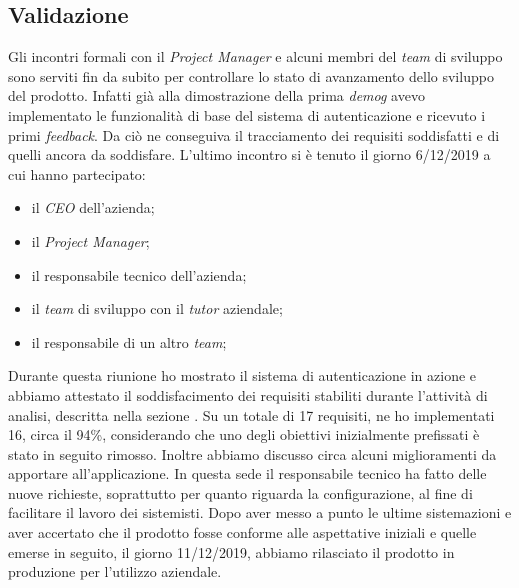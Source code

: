 \subsection{Validazione}
Gli incontri formali con il \textit{Project Manager} e alcuni membri del \textit{team} di sviluppo sono serviti fin da subito per controllare lo stato di avanzamento dello sviluppo del prodotto. Infatti già alla dimostrazione della prima \textit{\gls{demog}} avevo implementato le funzionalità di base del sistema di autenticazione e ricevuto i primi \textit{feedback}. Da ciò ne conseguiva il tracciamento dei requisiti soddisfatti e di quelli ancora da soddisfare.
L'ultimo incontro si è tenuto il giorno 6/12/2019 a cui hanno partecipato:
    \begin{itemize}
            \item il \textit{CEO} dell'azienda;
            \item il \textit{Project Manager};
            \item il responsabile tecnico dell'azienda;
            \item il \textit{team} di sviluppo con il \textit{tutor} aziendale;
            \item il responsabile di un altro \textit{team};
    \end{itemize}
Durante questa riunione ho mostrato il sistema di autenticazione in azione e abbiamo attestato il soddisfacimento dei requisiti stabiliti durante l'attività di analisi, descritta nella sezione . Su un totale di 17 requisiti, ne ho implementati 16, circa il 94\%, considerando che uno degli obiettivi inizialmente prefissati è stato in seguito rimosso.
Inoltre abbiamo discusso circa alcuni miglioramenti da apportare all'applicazione. In questa sede il responsabile tecnico ha fatto delle nuove richieste, soprattutto per quanto riguarda la configurazione, al fine di facilitare il lavoro dei sistemisti. Dopo aver messo a punto le ultime sistemazioni e aver accertato che il prodotto fosse conforme alle aspettative iniziali e quelle emerse in seguito, il giorno 11/12/2019, abbiamo rilasciato il prodotto in produzione per l'utilizzo aziendale. \\